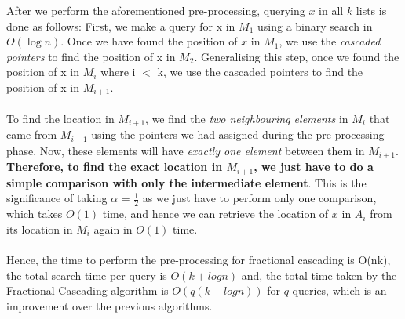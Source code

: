 \documentclass[11pt]{article}
\begin{document}
After we perform the aforementioned pre-processing, querying $x$ in all $k$ lists is done as follows:
First, we make a query for x in $M_1$ using a binary search in $O(\log n)$. Once we have found the position of $x$ in $M_1$, we use the \textit{cascaded pointers} to find the position of x in $M_2$. Generalising this step, once we found the position of x in $M_i$ where i $<$ k, we use the cascaded pointers to find the position of x in $M_{i+1}$. \\ \\
To find the location in $M_{i+1}$, we find the \textit{two neighbouring elements} in $M_{i}$ that came from $M_{i+1}$ using the pointers we had assigned during the pre-processing phase. Now, these elements will have \textit{exactly one element} between them in $M_{i+1}$. \textbf{Therefore, to find the exact location in $M_{i+1}$, we just have to do a simple comparison with only the intermediate element}. This is the significance of taking $\alpha$ = $\frac{1}{2}$ as we just have to perform only one comparison, which takes $O(1)$ time, and hence we can retrieve the location of $x$ in $A_i$ from its location in $M_i$ again in $O(1)$ time. \\ \\

Hence, the time to perform the pre-processing for fractional cascading is O(nk), the total search time per query is $O(k+log n)$ and, the total time taken by the Fractional Cascading algorithm is $O(q(k+logn))$ for $q$ queries, which is an improvement over the previous algorithms.
\end{document}
